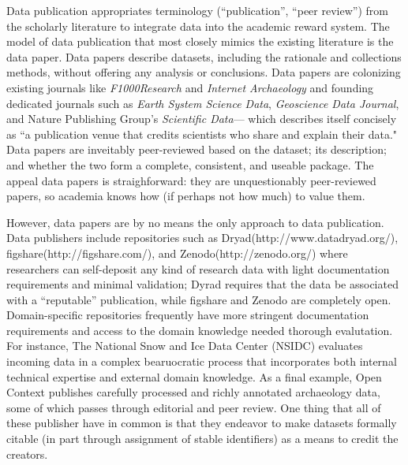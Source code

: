 \documentclass[10pt]{article}
\begin{document}
Data publication appropriates terminology (``publication'', ``peer review'') from the scholarly literature to integrate data into the academic reward system\cite{costello_motivating_2009, lawrence_data_2011, atici_other_2012}.
The model of data publication that most closely mimics the existing literature is the data paper.
Data papers describe datasets, including the rationale and collections methods, without offering any analysis or conclusions\cite{newman_data_2009, callaghan_processes_2013}.
Data papers are colonizing existing journals like \emph{F1000Research} and \emph{Internet Archaeology} and founding dedicated journals such as \emph{Earth System Science Data}, \emph{Geoscience Data Journal}\cite{allan_geoscience_2014}, and Nature Publishing Group's \emph{Scientific Data}--- which describes itself concisely as ``a publication venue that credits scientists who share and explain their data." \cite{_more_2014}
Data papers are inveitably peer-reviewed based on the dataset; its description; and whether the two form a complete, consistent, and useable package\cite{lawrence_data_2011}.
The appeal data papers is straighforward: they are unquestionably peer-reviewed papers, so academia knows how (if perhaps not how much) to value them.

However, data papers are by no means the only approach to data publication.
Data publishers include repositories such as Dryad(http://www.datadryad.org/), figshare(http://figshare.com/), and Zenodo(http://zenodo.org/) where researchers can self-deposit any kind of research data with light documentation requirements and minimal validation; Dyrad requires that the data be associated with a ``reputable'' publication, while figshare and Zenodo are completely open.
Domain-specific repositories frequently have more stringent documentation requirements and access to the domain knowledge needed thorough evalutation.
For instance, The National Snow and Ice Data Center (NSIDC) evaluates incoming data in a complex bearuocratic process that incorporates both internal technical expertise and external domain knowledge\cite{weaver_data_2012}.
As a final example, Open Context publishes carefully processed and richly annotated archaeology data, some of which passes through editorial and peer review\cite{kansa_we_2014}.
One thing that all of these publisher have in common is that they endeavor to make datasets formally citable (in part through assignment of stable identifiers) as a means to credit the creators.
\end{document}

